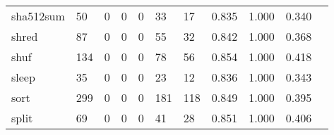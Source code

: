 \begin{longtable}{lp{1.2cm}p{1.2cm}p{1.2cm}p{1.2cm}p{1.2cm}p{1.2cm}p{1.2cm}p{1.2cm}p{1.2cm}p{1.2cm}}
sha512sum &                                    50 &                                                  0 &                                                  0 &                                                  0 &                                                 33 &                                                 17 &                                         0.835 &                                              1.000 &                                              0.340 \\
shred     &                                    87 &                                                  0 &                                                  0 &                                                  0 &                                                 55 &                                                 32 &                                         0.842 &                                              1.000 &                                              0.368 \\
shuf      &                                   134 &                                                  0 &                                                  0 &                                                  0 &                                                 78 &                                                 56 &                                         0.854 &                                              1.000 &                                              0.418 \\
sleep     &                                    35 &                                                  0 &                                                  0 &                                                  0 &                                                 23 &                                                 12 &                                         0.836 &                                              1.000 &                                              0.343 \\
sort      &                                   299 &                                                  0 &                                                  0 &                                                  0 &                                                181 &                                                118 &                                         0.849 &                                              1.000 &                                              0.395 \\
split     &                                    69 &                                                  0 &                                                  0 &                                                  0 &                                                 41 &                                                 28 &                                         0.851 &                                              1.000 &                                              0.406 \\

\end{longtable}
